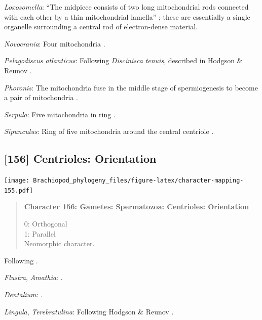 \documentclass[openany]{book}
\begin{document}
\hypertarget{Loxosomella-coding-155}{}
\emph{Loxosomella}: ``The midpiece consists of two long mitochondrial
rods connected with each other by a thin mitochondrial lamella''
\citep[in \emph{Loxosoma}]{Franzen2000}; these are essentially a single
organelle surrounding a central rod of electron-dense material.

\hypertarget{Novocrania-coding-155}{}
\emph{Novocrania}: Four mitochondria \citep{Afzelius1978Finestructure}.

\hypertarget{Pelagodiscus_atlanticus-coding-155}{}
\emph{Pelagodiscus atlanticus}: Following \emph{Discinisca}
\emph{tenuis}, described in Hodgson \& Reunov
\citeyearpar{Hodgson1994Ultrastructureof}.

\hypertarget{Phoronis-coding-155}{}
\emph{Phoronis}: The mitochondria fuse in the middle stage of
spermiogenesis to become a pair of mitochondria
\citep{Reunov2004Ultrastructuralstudy}.

\hypertarget{Serpula-coding-155}{}
\emph{Serpula}: Five mitochondria in ring \citep{Gherardi2011}.

\hypertarget{Sipunculus-coding-155}{}
\emph{Sipunculus}: Ring of five mitochondria around the central
centriole \citep{Rice1993}.

\subsection*{{[}156{]} Centrioles:
Orientation}\label{centrioles-orientation}

\texttt{[image: Brachiopod\_phylogeny\_files/figure-latex/character-mapping-155.pdf]}

\begin{quote}
\textbf{Character 156: Gametes: Spermatozoa: Centrioles: Orientation}

0: Orthogonal\\
1: Parallel\\
Neomorphic character.
\end{quote}

Following \citet{Hodgson1994Ultrastructureof}.

\hypertarget{Amathia-coding-156}{}
\emph{Flustra}, \emph{Amathia}: \citep{Franzen1981}.

\hypertarget{Dentalium-coding-156}{}
\emph{Dentalium}: \citet{DufresneDube1983}.

\hypertarget{Lingula-coding-156}{}
\emph{Lingula}, \emph{Terebratulina}: Following Hodgson \& Reunov
\citeyearpar{Hodgson1994Ultrastructureof}.
\end{document}
